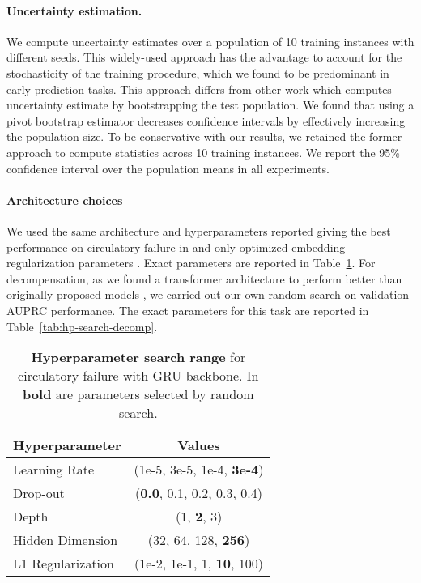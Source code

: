 \documentclass[nohyperref]{article}
\begin{document}
\paragraph{Uncertainty estimation.} We compute uncertainty estimates over a population of 10 training instances with different seeds. This widely-used approach has the advantage to account for the stochasticity of the training procedure, which we found to be predominant in early prediction tasks. This approach differs from other work \citep{roy2021multitask,roy2022disability,tomavsev2019,tomavsev2021} which computes uncertainty estimate by bootstrapping the test population. We found that using a pivot bootstrap estimator decreases confidence intervals by effectively increasing the population size. To be conservative with our results, we retained the former approach to compute statistics across 10 training instances. We report the 95\% confidence interval over the population means in all experiments. 

\paragraph{Architecture choices} We used the same architecture and hyperparameters reported giving the best performance on {circulatory failure} in \citet{yeche2021} and only optimized embedding regularization parameters \citep{tomavsev2019}. Exact parameters are reported in Table~\ref{tab:hp-search-gru}. For {decompensation}, as we found a transformer architecture to perform better than originally proposed models \citep{harutyunyan2019multitask}, we carried out our own random search on validation AUPRC performance. The exact parameters for this task are reported in Table~\ref{tab:hp-search-decomp}. 





\begin{table}[tbh!]
    \centering
\caption{\textbf{Hyperparameter search range} for {circulatory failure} with GRU \citep{DBLP:journals/corr/ChungGCB14} backbone. In \textbf{bold} are parameters selected by random search.}
\begin{tabular}{lc}
\toprule
Hyperparameter & Values\\
\midrule
\midrule
Learning Rate & (1e-5, 3e-5, 1e-4, \textbf{3e-4}) \\
\midrule
Drop-out & (\textbf{0.0}, 0.1, 0.2, 0.3, 0.4) \\
\midrule
Depth &   (1, \textbf{2}, 3) \\
\midrule
Hidden Dimension & (32, 64, 128, \textbf{256}) \\
\midrule
L1 Regularization &  (1e-2, 1e-1, 1, \textbf{10}, 100)\\
\bottomrule
\end{tabular}
\label{tab:hp-search-gru}
\end{table}
\end{document}
